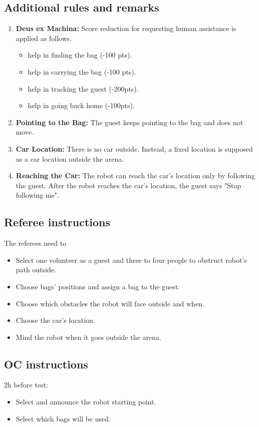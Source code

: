 \subsection{Additional rules and remarks}
\begin{enumerate}[nosep]
	\item \textbf{Deus ex Machina:} Score reduction for requesting human assistance is applied as follows.
	\begin{itemize}
		\item help in finding the bag (-100 pts).
		\item help in carrying the bag (-100 pts).
		\item help in tracking the guest (-200pts).
		\item help in going back home (-100pts).
	\end{itemize}

	\item \textbf{Pointing to the Bag:} The guest keeps pointing to the bag and does not move. 

	\item \textbf{Car Location:} There is no car outside. Instead, a fixed location is supposed as a car location outside the arena.

	\item \textbf{Reaching the Car:} The robot can reach the car's location only by following the guest. After the robot reaches the car's location, the guest says "Stop following me".
	
	
\end{enumerate}


\subsection{Referee instructions}

The referees need to
\begin{itemize}
	\item Select one volunteer as a guest and three to four people to obstruct robot's path outside.
	\item Choose bags' positions and assign a bag to the guest.
	\item Choose which obstacles the robot will face outside and when.
	\item Choose the car's location.
	\item Mind the robot when it goes outside the arena.
\end{itemize}

\subsection{OC instructions}

2h before test:
\begin{itemize}
	\item Select and announce the robot starting point.
	\item Select which bags will be used.
\end{itemize}

% 
